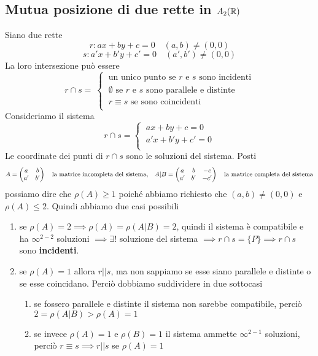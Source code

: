 \documentclass[twoside]{report}
\begin{document}
\subsection{Mutua posizione di due rette in \(A_2(\RR )\)}
Siano due rette \[
r: ax + by + c = 0 \quad (a,b) \neq (0,0)
\] \[
s: a'x + b'y + c' = 0 \quad (a', b') \neq (0,0)
\]
La loro intersezione può essere \[ r \cap s = \
\begin{cases}
    \ \text{un unico punto se \(r\) e \(s\) sono incidenti} \\
    \ \emptyset \text{ se \(r\) e \(s\) sono parallele e distinte} \\
    \ r \equiv s \text{ se sono coincidenti } \\
\end{cases}
\]
Consideriamo il sistema \[r \cap s=
\begin{cases}
    \ ax + by + c = 0 \\
    \ a'x + b'y + c' = 0 \\
\end{cases}
\]
Le coordinate dei punti di \(r \cap s\) sono le soluzioni del sistema. Posti \[
A =
\left( \; \\
 \begin{matrix}
    a & b \\
    a' & b' \\
\end{matrix} \; \\
 \right) \quad \text{la matrice incompleta del sistema,}
 \quad A|B =
\left( \; \\
 \begin{matrix}
    a & b & -c \\
    a' & b' & -c' \\
\end{matrix} \; \\
 \right) \quad \text{la matrice completa del sistema}
\] possiamo dire che \(\rho(A) \ge 1\) poiché abbiamo richiesto che \((a,b) \neq (0,0)\) e \(\rho(A) \le 2\). Quindi abbiamo due casi possibili
\begin{enumerate}
    \item se \(\rho(A) = 2 \implies \rho(A) = \rho(A|B) =2\), quindi il sistema è compatibile e ha \(\infty^{2-2}\) soluzioni \(\implies \exists !\) soluzione del sistema \(\implies r \cap s = \{P\} \implies r \cap s\) sono \textbf{incidenti}.
    \item se \(\rho(A) = 1\) allora \(r || s\), ma non sappiamo se esse siano parallele e distinte o se esse coincidano. Perciò dobbiamo suddividere in due sottocasi
        \begin{enumerate}
            \item se fossero parallele e distinte il sistema non sarebbe compatibile, perciò \(2= \rho(A|B) > \rho(A) = 1\)
            \item se invece \(\rho(A) = 1\) e \(\rho(B) = 1\) il sistema ammette \(\infty^{2-1}\) soluzioni, perciò \(r \equiv s \implies r||s\) se \(\rho(A) = 1\)
        \end{enumerate}
\end{enumerate}
\newpage
\end{document}
